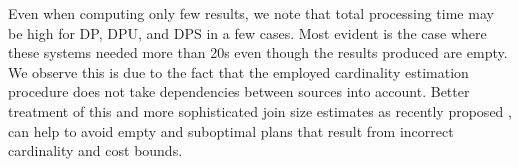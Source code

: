 Even when computing only few results, we note that total processing
time may be high for DP, DPU, and DPS in a few cases. Most evident is
the case where these systems needed more than 20s even though the
results produced are empty. We observe this is due to the fact that
the employed cardinality estimation procedure does not take
dependencies between sources into account. Better treatment of this
and more sophisticated join size estimates as recently proposed
\todo{}, can help to avoid empty and suboptimal plans that result from
incorrect cardinality and cost bounds.



















